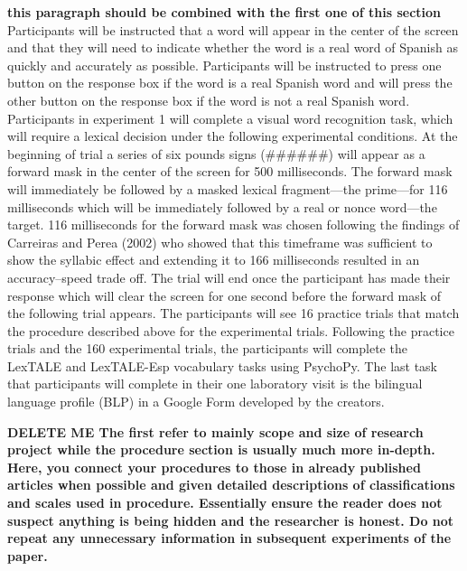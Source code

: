 \textbf{this paragraph should be combined with the first one of this section}
Participants will be instructed that a word will appear in the center of the screen and that they will need to indicate whether the word is a real word of Spanish as quickly and accurately as possible. Participants will be instructed to press one button on the response box if the word is a real Spanish word and will press the other button on the response box if the word is not a real Spanish word. Participants in experiment 1 will complete a visual word recognition task, which will require a lexical decision under the following experimental conditions. At the beginning of trial a series of six pounds signs (\#\#\#\#\#\#) will appear as a forward mask in the center of the screen for 500 milliseconds. The forward mask will immediately be followed by a masked lexical fragment—the prime—for 116 milliseconds which will be immediately followed by a real or nonce word—the target. 116 milliseconds for the forward mask was chosen following the findings of Carreiras and Perea (2002) who showed that this timeframe was sufficient to show the syllabic effect and extending it to 166 milliseconds resulted in an accuracy–speed trade off. The trial will end once the participant has made their response which will clear the screen for one second before the forward mask of the following trial appears. The participants will see 16 practice trials that match the procedure described above for the experimental trials. Following the practice trials and the 160 experimental trials, the participants will complete the LexTALE and LexTALE-Esp vocabulary tasks using PsychoPy. The last task that participants will complete in their one laboratory visit is the bilingual language profile (BLP) in a Google Form developed by the creators.



\textbf{DELETE ME The first refer to mainly scope and size of research project while the procedure section is usually much more in-depth. Here, you connect your procedures to those in already published articles when possible and given detailed descriptions of classifications and scales used in procedure. Essentially ensure the reader does not suspect anything is being hidden and the researcher is honest. Do not repeat any unnecessary information in subsequent experiments of the paper.}



